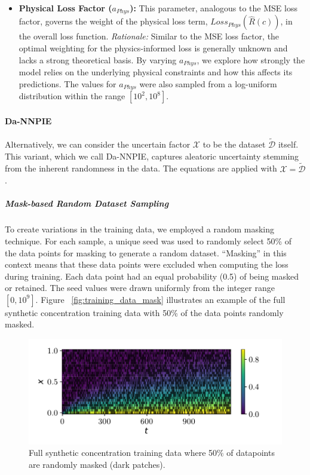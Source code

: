 \begin{itemize}
    \item \textbf{Physical Loss Factor ($a_{Phys}$):}  This parameter, analogous to the MSE loss factor, governs the weight of the physical loss term, $Loss_{Phys}(\hat{R}(c))$, in the overall loss function. \textit{Rationale:} Similar to the MSE loss factor, the optimal weighting for the physics-informed loss is generally unknown and lacks a strong theoretical basis. By varying $a_{Phys}$, we explore how strongly the model relies on the underlying physical constraints and how this affects its predictions. The values for $a_{Phys}$ were also sampled from a log-uniform distribution within the range $[10^2, 10^8]$.
\end{itemize}



\paragraph{Da-NNPIE}

Alternatively, we can consider the uncertain factor $\mathcal{X}$ to be the dataset $\tilde{\mathcal{D}}$ itself. This variant, which we call Da-NNPIE, captures aleatoric uncertainty stemming from the inherent randomness in the data. The equations are applied with $\mathcal{X} = \tilde{\mathcal{D}}$.


\subparagraph{Mask-based Random Dataset Sampling}

To create variations in the training data, we employed a random masking technique. For each sample, a unique seed was used to randomly select 50\% of the data points for masking to generate a random dataset. ``Masking'' in this context means that these data points were excluded when computing the loss during training. Each data point had an equal probability (0.5) of being masked or retained. The seed values were drawn uniformly from the integer range $[0, 10^9]$. Figure ~\vref{fig:training_data_mask} illustrates an example of the full synthetic concentration training data with 50\% of the data points randomly masked.

\begin{figure}[h]
    \centering
    \includegraphics{figs/c_diss_field_train_random_subset.pdf}
    \caption{Full synthetic concentration training data where 50\% of datapoints are randomly masked (dark patches).}
    \label{fig:training_data_mask}
\end{figure}


